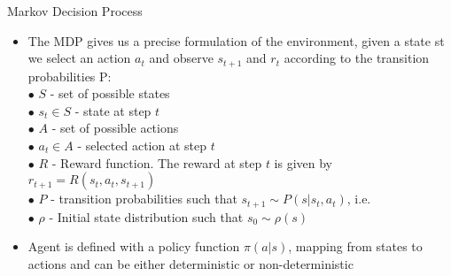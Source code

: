 \begin{frame}{Markov Decision Process}
    \begin{itemize}
        
        \item The MDP gives us a precise formulation of the environment, given a state st we select an action $a_{t}$ and observe $s_{t+1}$ and $r_{t}$ according to the transition probabilities P:\\
        \bigskip
        \hspace{0.5cm}$\bullet$  $S$ - set of possible states \\
        \hspace{0.5cm}$\bullet$  $s_{t}\in S$ - state at step $t$ \\
        \hspace{0.5cm}$\bullet$  $A$ - set of possible actions \\
        \hspace{0.5cm}$\bullet$  $a_{t}\in A$ - selected action at step $t$\\
        \hspace{0.5cm}$\bullet$  $R$ - Reward function. The reward at step $t$ is given by $r_{t+1} = R(s_{t}, a_{t}, s_{t+1})$\\
        \hspace{0.5cm}$\bullet$ $P$ - transition probabilities such that $s_{t+1} \sim P(s|s_{t},a_{t})$, i.e. \\
        \hspace{0.5cm}$\bullet$  $\rho$ - Initial state distribution such that $s_{0} \sim \rho(s)$\\
        \bigskip
        \item Agent is defined with a policy function $\pi(a|s)$, mapping from states to actions and can be either deterministic or non-deterministic
        
    \end{itemize}
\end{frame}

